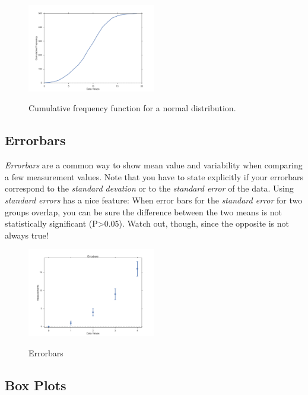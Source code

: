 \begin{figure}[ht]
  \centering
  \includegraphics[width=0.5\textwidth]{../Images/CumulativeFrequencyFunction.png}\\
  \caption{Cumulative frequency function for a normal distribution.}
\end{figure}

\subsection{Errorbars}

\emph{Errorbars} are a common way to show mean value and variability when comparing a few measurement values. Note that you have to state explicitly if your errorbars correspond to the \emph{standard devation} or to the \emph{standard error} of the data. Using \emph{standard errors} has a nice feature: When error bars for the \emph{standard error} for two groups overlap, you can be sure the difference between the two means is not statistically significant (P>0.05). Watch out, though, since the opposite is not always true!

\begin{figure}[ht]
  \centering
  \includegraphics[width=0.5\textwidth]{../Images/Errorbars.png}\\
  \caption{Errorbars}
\end{figure}


\subsection{Box Plots}

